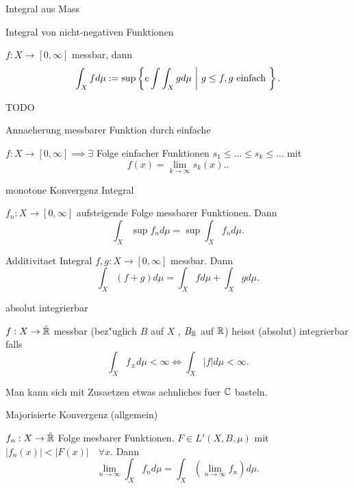 \documentclass[class=article, crop=false]{standalone}
\begin{document}
\begin{zettel}{Integral aus Mass}
\begin{flashcard}[jaecw7pt]{Integral von nicht-negativen Funktionen}
	\begin{definition}
		$f: X \to  [0,\infty]$  messbar, dann
		\[
			\int_{X} fd\mu := \sup \set{e \int \int_{X} gd\mu}{g \leq  f, g \tx{einfach} }
		.\]
	\end{definition}
\end{flashcard}
\begin{lemma}[Eigenschaften]
	TODO
\end{lemma}

\begin{flashcard}[aqs7rf0k]{Annaeherung messbarer Funktion durch einfache}
	\begin{lemma}
		$f:X \to  [0,\infty] \implies \exists$ Folge einfacher Funktionen $s_1 \leq \dots \leq s_k \leq \dots$ mit
		\[
			f(x) = \lim_{k \to \infty} s_k(x).
		.\]
	\end{lemma}
\end{flashcard}

\begin{flashcard}[r1396eph]{monotone Konvergenz Integral}
	\begin{definition}
		$f_n : X \to  [0,\infty]$ aufsteigende Folge messbarer Funktionen. Dann
		\[
			\int_{X} \sup f_n d\mu = \sup \int_{X} f_n d\mu
		.\]
	\end{definition}
\end{flashcard}

\begin{flashcard}[d1o0mf6y]{Additivitaet Integral}
	$f,g : X \to  [0,\infty]$ messbar. Dann
	\[
		\int_{X}(f + g) d\mu = \int_{X} fd\mu + \int_{X} gd\mu
	.\]
\end{flashcard}

\begin{flashcard}[1qexfp0s]{absolut integrierbar}
	\begin{definition}
		$f: X \to  \hat{\mathbb{R} }$ messbar (bez"uglich $B$ auf $X$ , $B_{\mathbb{R}}$ auf $\mathbb{R} $) heisst (absolut) integrierbar falls
		\[
			\int_{X} f_{\pm }d\mu < \infty \iff \int_{X} |f| d\mu < \infty
		.\]
	\end{definition}
	Man kann sich mit Zusaetzen etwas aehnliches fuer $\mathbb{C} $ basteln.
\end{flashcard}

\begin{flashcard}[c5nqxbd1]{Majorisierte Konvergenz (allgemein)}
	\begin{theorem}
		$f_n :X \to  \hat{\mathbb{R} }$ Folge mesbarer Funktionen. $F \in L'(X,B,\mu)$ mit $ |f_n(x) | < |F(x)| \quad \forall x$.
		Dann
		\[
			\lim_{n \to \infty} \int_{X} f_n d\mu = \int_{X} \left(\lim_{n \to \infty} f_n \right) d\mu
		.\]
	\end{theorem}
\end{flashcard}
\end{zettel}
\end{document}
